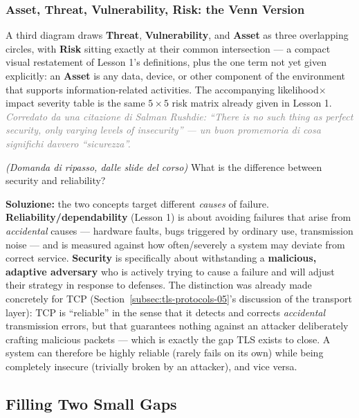 \documentclass[12pt, a4paper]{article}
\newcounter{esercizio}[section]
\begin{document}
\subsubsection{Asset, Threat, Vulnerability, Risk: the Venn Version}
A third diagram draws \textbf{Threat}, \textbf{Vulnerability}, and \textbf{Asset} as three overlapping circles, with \textbf{Risk} sitting exactly at their common intersection --- a compact visual restatement of Lesson 1's definitions, plus the one term not yet given explicitly: an \textbf{Asset} is any data, device, or other component of the environment that supports information-related activities. The accompanying likelihood$\times$impact severity table is the same $5\times5$ risk matrix already given in Lesson 1. \textcolor{gray}{\textit{Corredato da una citazione di Salman Rushdie: ``There is no such thing as perfect security, only varying levels of insecurity'' --- un buon promemoria di cosa significhi davvero ``sicurezza''.}}

\begin{tcolorbox}[colback=lightergray!10, colframe=tocsec, title=\textbf{Esercizio \theesercizio}]
\textit{(Domanda di ripasso, dalle slide del corso)} What is the difference between security and reliability?
\end{tcolorbox}

\textbf{Soluzione:} the two concepts target different \emph{causes} of failure. \textbf{Reliability/dependability} (Lesson 1) is about avoiding failures that arise from \emph{accidental} causes --- hardware faults, bugs triggered by ordinary use, transmission noise --- and is measured against how often/severely a system may deviate from correct service. \textbf{Security} is specifically about withstanding a \textbf{malicious, adaptive adversary} who is actively trying to cause a failure and will adjust their strategy in response to defenses. The distinction was already made concretely for TCP (Section~\ref{subsec:tls-protocols-05}'s discussion of the transport layer): TCP is ``reliable'' in the sense that it detects and corrects \emph{accidental} transmission errors, but that guarantees nothing against an attacker deliberately crafting malicious packets --- which is exactly the gap TLS exists to close. A system can therefore be highly reliable (rarely fails on its own) while being completely insecure (trivially broken by an attacker), and vice versa.

\subsection{Filling Two Small Gaps}
\end{document}
